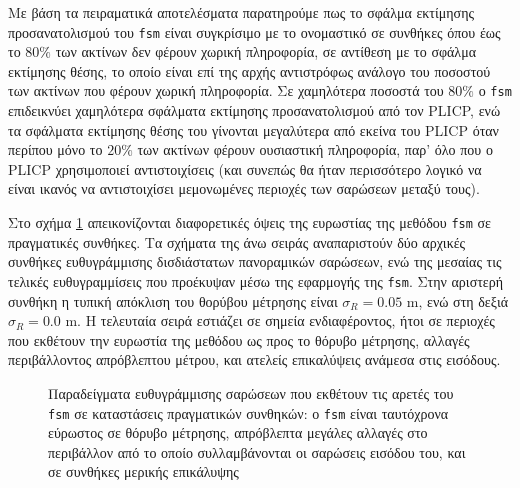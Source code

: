 Με βάση τα πειραματικά αποτελέσματα παρατηρούμε πως το σφάλμα εκτίμησης
προσανατολισμού του \texttt{fsm} είναι συγκρίσιμο με το ονομαστικό σε συνθήκες
όπου έως το $80\%$ των ακτίνων δεν φέρουν χωρική πληροφορία, σε αντίθεση με το
σφάλμα εκτίμησης θέσης, το οποίο είναι επί της αρχής αντιστρόφως ανάλογο του
ποσοστού των ακτίνων που φέρουν χωρική πληροφορία. Σε χαμηλότερα ποσοστά του
$80\%$ ο \texttt{fsm} επιδεικνύει χαμηλότερα σφάλματα εκτίμησης προσανατολισμού
από τον PLICP, ενώ τα σφάλματα εκτίμησης θέσης του γίνονται μεγαλύτερα από
εκείνα του PLICP όταν περίπου μόνο το $20\%$ των ακτίνων φέρουν ουσιαστική
πληροφορία, παρ' όλο που ο PLICP χρησιμοποιεί αντιστοιχίσεις (και συνεπώς θα
ήταν περισσότερο λογικό να είναι ικανός να αντιστοιχίσει μεμονωμένες περιοχές
των σαρώσεων μεταξύ τους).

Στο σχήμα \ref{fig:02_05_04:04} απεικονίζονται διαφορετικές όψεις της ευρωστίας
της μεθόδου \texttt{fsm} σε πραγματικές συνθήκες. Τα σχήματα της άνω σειράς
αναπαριστούν δύο αρχικές συνθήκες ευθυγράμμισης δισδιάστατων πανοραμικών
σαρώσεων, ενώ της μεσαίας τις τελικές ευθυγραμμίσεις που προέκυψαν μέσω της
εφαρμογής της \texttt{fsm}. Στην αριστερή συνθήκη η τυπική απόκλιση του θορύβου
μέτρησης είναι $\sigma_R = 0.05$ m, ενώ στη δεξιά $\sigma_R = 0.0$ m. Η
τελευταία σειρά εστιάζει σε σημεία ενδιαφέροντος, ήτοι σε περιοχές που εκθέτουν
την ευρωστία της μεθόδου ως προς το θόρυβο μέτρησης, αλλαγές περιβάλλοντος
απρόβλεπτου μέτρου, και ατελείς επικαλύψεις ανάμεσα στις εισόδους.

\begin{figure}[]\centering
  
  \vspace{-1cm}
  \caption{\small Παραδείγματα ευθυγράμμισης σαρώσεων που εκθέτουν τις αρετές
           του \texttt{fsm} σε καταστάσεις πραγματικών συνθηκών: ο \texttt{fsm}
           είναι ταυτόχρονα εύρωστος σε θόρυβο μέτρησης, απρόβλεπτα μεγάλες
           αλλαγές στο περιβάλλον από το οποίο συλλαμβάνονται οι σαρώσεις
           εισόδου του, και σε συνθήκες μερικής επικάλυψης}
  \label{fig:02_05_04:04}
\end{figure}
